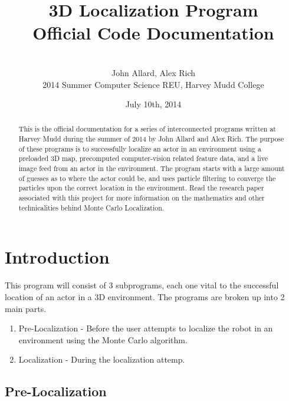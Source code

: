 \documentclass[a4paper,11pt]{article}
\title{3D Localization Program \\ Official Code Documentation}
\author{ \\[7in]  John Allard, Alex Rich \\ 2014 Summer Computer Science REU, Harvey Mudd College}
\date{July 10th, 2014}
\begin{document}
  \maketitle
  \newpage

    \tableofcontents
    \newpage

  \begin{abstract}
  This is the official documentation for a series of interconnected programs written at Harvey Mudd during the summer of 2014 by John Allard and Alex Rich. The purpose of these programs is to successfully localize an actor in an environment using a preloaded 3D map, precomputed computer-vision related feature data, and a live image feed from an actor in the environment. The program starts with a large amount of guesses as to where the actor could be, and uses particle filtering to converge the particles upon the correct location in the environment. Read the research paper associated with this project for more information on the mathematics and other technicalities behind Monte Carlo Localization.
  \end{abstract}

  \section{Introduction}
  This program will consist of 3 subprograms, each one vital to the successful location of an actor in a 3D environment. The programs are broken up into 2 main parts.
  \begin{enumerate}
  \item Pre-Localization - Before the user attempts to localize the robot in an environment using the Monte Carlo algorithm.
  \item Localization - During the localization attemp.
  \end{enumerate}

  \subsection{Pre-Localization}
\end{document}
